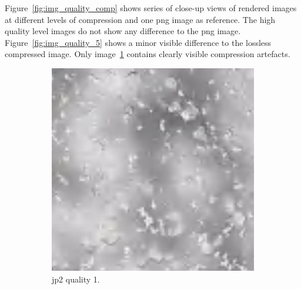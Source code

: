 Figure~\ref{fig:img_quality_comp} shows series of close-up views of rendered images at different levels of compression and one \gls{png} image as reference. The high quality level images do not show any difference to the \gls{png} image. Figure~\ref{fig:img_quality_5} shows a minor visible difference to the lossless compressed image. Only image~\ref{fig:img_quality_1} contains clearly visible compression artefacts.
\begin{figure}[htb]
    \centering
        \begin{subfigure}[b]{0.44\textwidth}
            \centering
            \includegraphics[width=\textwidth]{doc/thesis/0_figures/compare_quality/set1/jp2_1_center.png}
            \caption{\gls{jp2} quality 1.}
            \label{fig:img_quality_1}
        \end{subfigure}
        \begin{subfigure}[b]{0.44\textwidth}
            \centering

\end{subfigure}
\end{figure}
